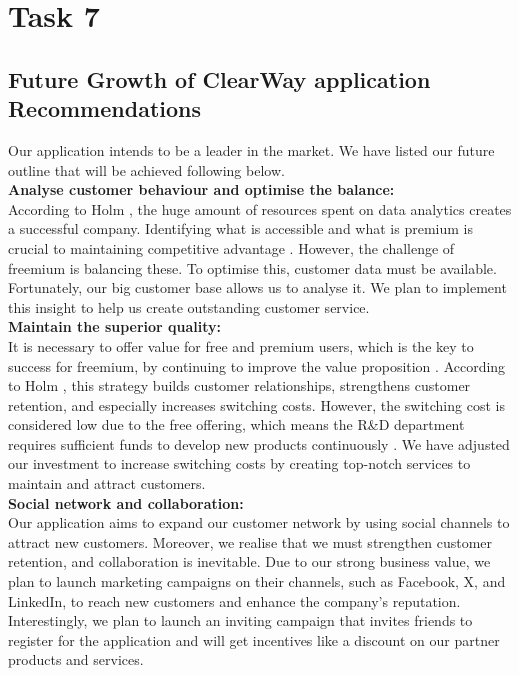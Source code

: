 \documentclass[12pt,a4paper]{article}
\begin{document}
\setcounter{page}{17}
\label{sec:Question 7}
\section{Task 7}

\subsection{Future Growth of ClearWay application Recommendations}
\noindent Our application intends to be a leader in the market. We have listed our future outline that will be achieved following below.\\

\noindent \textbf{Analyse customer behaviour and optimise the balance:} \\
\noindent  According to Holm \citep{task_7.1}, the huge amount of resources spent on data analytics creates a successful company. Identifying what is accessible and what is premium is crucial to maintaining competitive advantage \citep{task_7.1}. However, the challenge of freemium is balancing these. To optimise this, customer data must be available. Fortunately, our big customer base allows us to analyse it. We plan to implement this insight to help us create outstanding customer service.\\

\noindent \textbf{Maintain the superior quality:} \\
\noindent  It is necessary to offer value for free and premium users, which is the key to success for freemium, by continuing to improve the value proposition \citep{task_7.1}. According to Holm \citep{task_7.1}, this strategy builds customer relationships, strengthens customer retention, and especially increases switching costs. However, the switching cost is considered low due to the free offering, which means the R\&D department requires sufficient funds to develop new products continuously \citep{task_7.1}. We have adjusted our investment to increase switching costs by creating top-notch services to maintain and attract customers.\\

\noindent \textbf{Social network and collaboration:} \\
\noindent  Our application aims to expand our customer network by using social channels to attract new customers. Moreover, we realise that we must strengthen customer retention, and collaboration is inevitable. Due to our strong business value, we plan to launch marketing campaigns on their channels, such as Facebook, X, and LinkedIn, to reach new customers and enhance the company's reputation. Interestingly, we plan to launch an inviting campaign that invites friends to register for the application and will get incentives like a discount on our partner products and services. \\
\end{document}
